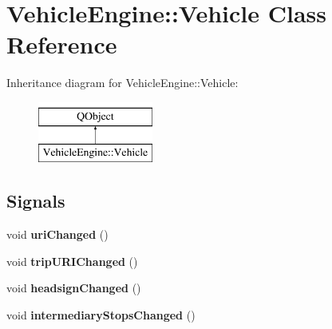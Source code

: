 \hypertarget{classVehicleEngine_1_1Vehicle}{}\section{Vehicle\+Engine\+:\+:Vehicle Class Reference}
\label{classVehicleEngine_1_1Vehicle}
Inheritance diagram for Vehicle\+Engine\+:\+:Vehicle\+:\begin{figure}[H]
\begin{center}
\leavevmode
\includegraphics[height=2.000000cm]{classVehicleEngine_1_1Vehicle}
\end{center}
\end{figure}
\subsection*{Signals}
\begin{DoxyCompactItemize}
\item 
\mbox{\label{classVehicleEngine_1_1Vehicle_a424944591db3168c779f29e7a57f53d3}} 
void {\bfseries uri\+Changed} ()
\item 
\mbox{\label{classVehicleEngine_1_1Vehicle_a6326f1db5b6232dab0102aa5023a4c4c}} 
void {\bfseries trip\+U\+R\+I\+Changed} ()
\item 
\mbox{\label{classVehicleEngine_1_1Vehicle_af99cdf961767ec0c230936ed062017de}} 
void {\bfseries headsign\+Changed} ()
\item 
\mbox{\label{classVehicleEngine_1_1Vehicle_a7e493b3cb817e60368bff73d6e09b4c9}} 
void {\bfseries intermediary\+Stops\+Changed} ()
\end{DoxyCompactItemize}
